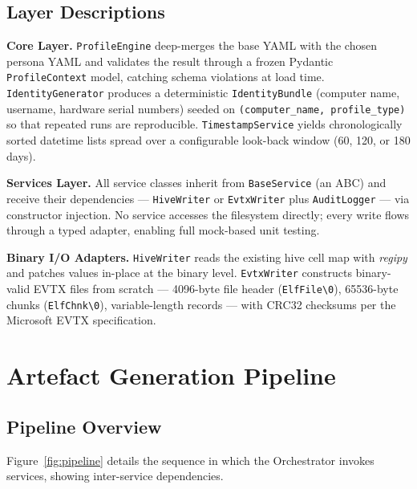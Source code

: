 \documentclass[12pt,a4paper]{article}
\begin{document}
\subsection{Layer Descriptions}

\textbf{Core Layer.}
\texttt{ProfileEngine} deep-merges the base YAML with the chosen persona YAML
and validates the result through a frozen Pydantic \texttt{ProfileContext}
model, catching schema violations at load time.
\texttt{IdentityGenerator} produces a deterministic \texttt{IdentityBundle}
(computer name, username, hardware serial numbers) seeded on
\texttt{(computer\_name, profile\_type)} so that repeated runs are
reproducible.
\texttt{TimestampService} yields chronologically sorted datetime lists spread
over a configurable look-back window (60, 120, or 180 days).

\textbf{Services Layer.}
All service classes inherit from \texttt{BaseService} (an ABC) and receive
their dependencies — \texttt{HiveWriter} or \texttt{EvtxWriter} plus
\texttt{AuditLogger} — via constructor injection.  No service accesses the
filesystem directly; every write flows through a typed adapter, enabling
full mock-based unit testing.

\textbf{Binary I/O Adapters.}
\texttt{HiveWriter} reads the existing hive cell map with \emph{regipy} and
patches values in-place at the binary level.
\texttt{EvtxWriter} constructs binary-valid EVTX files from scratch — 4096-byte
file header (\texttt{ElfFile\textbackslash 0}), 65536-byte chunks
(\texttt{ElfChnk\textbackslash 0}), variable-length records — with CRC32
checksums per the Microsoft EVTX specification.

\section{Artefact Generation Pipeline}
\label{sec:pipeline}

\subsection{Pipeline Overview}

Figure~\ref{fig:pipeline} details the sequence in which the Orchestrator
invokes services, showing inter-service dependencies.
\end{document}
